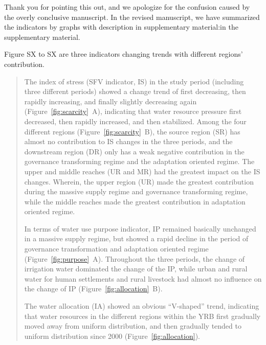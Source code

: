 \AR{} Thank you for pointing this out, and we apologize for the confusion caused by the overly conclusive manuscript. In the revised manuscript, we have summarized the indicators by graphs with description in supplementary material:in the supplementary material.

\AR*{} Figure SX to SX are three indicators changing trends with different regions' contribution.

\begin{quote}
	The index of stress (SFV indicator, IS) in the study period (including three different periods) showed a change trend of first decreasing, then rapidly increasing, and finally slightly decreasing again (Figure~\ref{fig:scarcity}~A), indicating that water resource pressure first decreased, then rapidly increased, and then stabilized.
	Among the four different regions (Figure~\ref{fig:scarcity}~B), the source region (SR) has almost no contribution to IS changes in the three periods, and the downstream region (DR) only has a weak negative contribution in the governance transforming regime and the adaptation oriented regime.
	The upper and middle reaches (UR and MR) had the greatest impact on the IS changes. Wherein, the upper region (UR) made the greatest contribution during the massive supply regime and governance transforming regime, while the middle reaches made the greatest contribution in adaptation oriented regime.

	In terms of water use purpose indicator, IP remained basically unchanged in a massive supply regime, but showed a rapid decline in the period of governance transformation and adaptation oriented regime (Figure~\ref{fig:purpose}~A).
	Throughout the three periods, the change of irrigation water dominated the change of the IP, while urban and rural water for human settlements and rural livestock had almost no influence on the change of IP (Figure~\ref{fig:allocation}~B).

	The water allocation (IA) showed an obvious ``V-shaped'' trend, indicating that water resources in the different regions within the YRB first gradually moved away from uniform distribution, and then gradually tended to uniform distribution since 2000 (Figure~\ref{fig:allocation}).
\end{quote}

